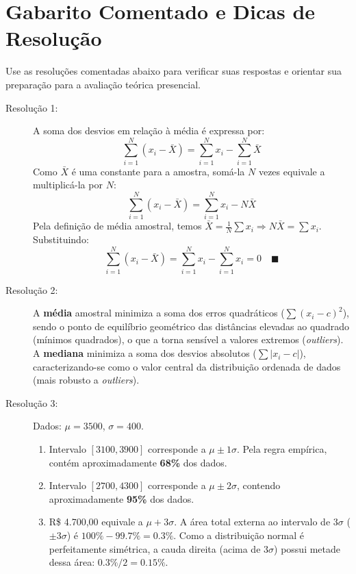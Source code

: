 \documentclass[12pt]{article}
\begin{document}
\pagebreak

\section*{Gabarito Comentado e Dicas de Resolução}

\begin{tcolorbox}[colback=yellow!10!white,colframe=yellow!50!black,title=\textbf{Dica de Estudo}]
Use as resoluções comentadas abaixo para verificar suas respostas e orientar sua preparação para a avaliação teórica presencial.
\end{tcolorbox}

\begin{description}
    \item[Resolução 1:] A soma dos desvios em relação à média é expressa por:
    $$\sum_{i=1}^{N} (x_i - \bar{X}) = \sum_{i=1}^{N} x_i - \sum_{i=1}^{N} \bar{X}$$
    Como $\bar{X}$ é uma constante para a amostra, somá-la $N$ vezes equivale a multiplicá-la por $N$:
    $$\sum_{i=1}^{N} (x_i - \bar{X}) = \sum_{i=1}^{N} x_i - N\bar{X}$$
    Pela definição de média amostral, temos $\bar{X} = \frac{1}{N} \sum x_i \Rightarrow N\bar{X} = \sum x_i$. Substituindo:
    $$\sum_{i=1}^{N} (x_i - \bar{X}) = \sum_{i=1}^{N} x_i - \sum_{i=1}^{N} x_i = 0 \quad \blacksquare$$

    \item[Resolução 2:] A \textbf{média} amostral minimiza a soma dos erros quadráticos ($\sum (x_i - c)^2$), sendo o ponto de equilíbrio geométrico das distâncias elevadas ao quadrado (mínimos quadrados), o que a torna sensível a valores extremos (\textit{outliers}). A \textbf{mediana} minimiza a soma dos desvios absolutos ($\sum |x_i - c|$), caracterizando-se como o valor central da distribuição ordenada de dados (mais robusto a \textit{outliers}).

    \item[Resolução 3:] Dados: $\mu = 3500$, $\sigma = 400$.
    \begin{enumerate}[label=\alph*)]
        \item Intervalo $[3100, 3900]$ corresponde a $\mu \pm 1\sigma$. Pela regra empírica, contém aproximadamente \textbf{68\%} dos dados.
        \item Intervalo $[2700, 4300]$ corresponde a $\mu \pm 2\sigma$, contendo aproximadamente \textbf{95\%} dos dados.
        \item R\$ 4.700,00 equivale a $\mu + 3\sigma$. A área total externa ao intervalo de $3\sigma$ ($\pm 3\sigma$) é $100\% - 99.7\% = 0.3\%$. Como a distribuição normal é perfeitamente simétrica, a cauda direita (acima de $3\sigma$) possui metade dessa área: $0.3\% / 2 = \mathbf{0.15\%}$.
    \end{enumerate}


\end{description}
\end{document}
